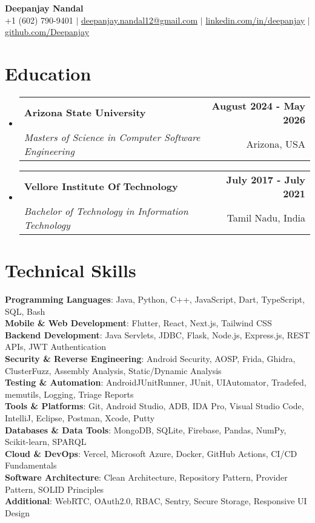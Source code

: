 \documentclass[letterpaper,11pt]{article}
\makeatletter
\newcommand{\resumeSubheading}[4]{
  \vspace{-1pt}\item
    \begin{tabular*}{0.97\textwidth}[t]{l@{\extracolsep{\fill}}r}
      \textbf{#1} & \textbf{#4} \\
      \textit{\normalsize #3} & \normalsize #2 \\
    \end{tabular*}\vspace{-3pt}
}
\newcommand{\resumeSubHeadingListStart}{\begin{itemize}[leftmargin=0.15in, label={}]}
\newcommand{\resumeSubHeadingListEnd}{\end{itemize}}
\makeatother
\begin{document}
\begin{center}
    {\fontsize{14pt}{16pt}\selectfont\textbf{Deepanjay Nandal}} \\ \vspace{2pt}
    \normalsize +1 (602) 790-9401 $|$ \href{mailto:deepanjay.nandal12@gmail.com}{deepanjay.nandal12@gmail.com} $|$ 
    \href{https://www.linkedin.com/in/deepanjay-nandal/}{linkedin.com/in/deepanjay} $|$
    \href{https://github.com/DeepanjayNandal}{github.com/Deepanjay}
\end{center}

\vspace{-3pt}

\vspace{-9pt}
\section{Education}
\resumeSubHeadingListStart
  \resumeSubheading
    {Arizona State University}{Arizona, USA}
    {Masters of Science in Computer Software Engineering}{August 2024 - May 2026}
  \resumeSubheading
    {Vellore Institute Of Technology}{Tamil Nadu, India}
    {Bachelor of Technology in Information Technology}{July 2017 - July 2021}
\resumeSubHeadingListEnd

\section{Technical Skills}
\begin{itemize}[leftmargin=0.15in, label={}]
  \small{\item{
    \textbf{Programming Languages}{: Java, Python, C++, JavaScript, Dart, TypeScript, SQL, Bash} \\
    \textbf{Mobile \& Web Development}{: Flutter, React, Next.js, Tailwind CSS} \\
    \textbf{Backend Development}{: Java Servlets, JDBC, Flask, Node.js, Express.js, REST APIs, JWT Authentication} \\
    \textbf{Security \& Reverse Engineering}{: Android Security, AOSP, Frida, Ghidra, ClusterFuzz, Assembly Analysis, Static/Dynamic Analysis} \\
    \textbf{Testing \& Automation}{: AndroidJUnitRunner, JUnit, UIAutomator, Tradefed, memutils, Logging, Triage Reports} \\
    \textbf{Tools \& Platforms}{: Git, Android Studio, ADB, IDA Pro, Visual Studio Code, IntelliJ, Eclipse, Postman, Xcode, Putty} \\
    \textbf{Databases \& Data Tools}{: MongoDB, SQLite, Firebase, Pandas, NumPy, Scikit-learn, SPARQL} \\
    \textbf{Cloud \& DevOps}{: Vercel, Microsoft Azure, Docker, GitHub Actions, CI/CD Fundamentals} \\
    \textbf{Software Architecture}{: Clean Architecture, Repository Pattern, Provider Pattern, SOLID Principles} \\
    \textbf{Additional}{: WebRTC, OAuth2.0, RBAC, Sentry, Secure Storage, Responsive UI Design}
  }}
\end{itemize}
\end{document}
